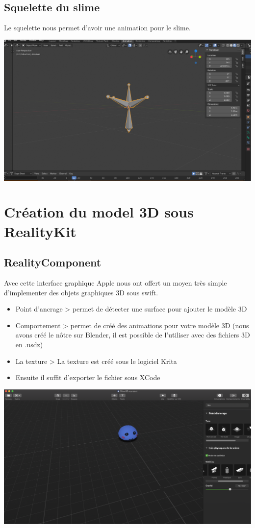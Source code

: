 \documentclass{article}
\begin{document}
\subsection{Squelette du slime}
Le squelette nous permet d'avoir une animation pour le slime.
\begin{center}
  \includegraphics[scale=0.3]{squeletteSlime.png}
\end{center}
\newpage
\section{Création du model 3D sous RealityKit}
\subsection{RealityComponent}
Avec cette interface graphique Apple nous ont offert un moyen très simple d'implementer des objets graphiques 3D sous swift. 
\begin{itemize}
    \item Point d'ancrage > permet de détecter une surface pour ajouter le modèle 3D
    \item Comportement > permet de créé des animations pour votre modèle 3D (nous avons créé le nôtre sur Blender, il est possible de l'utiliser avec des fichiers 3D en .usdz)
    \item La texture  > La texture est créé sous le logiciel Krita 
    \item Ensuite il suffit d'exporter le fichier sous XCode 
\end{itemize}
\begin{center}
  \includegraphics[scale=0.3]{realitycompo.png}
\end{center}
\end{document}
